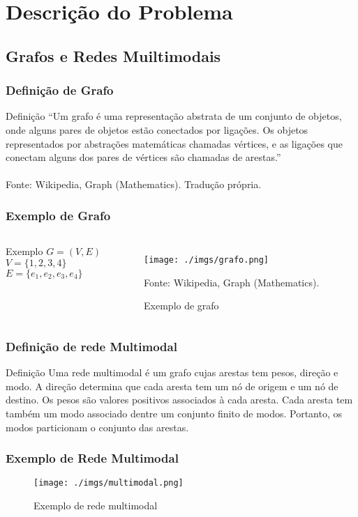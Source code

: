 \section{Descrição do Problema}

\subsection{Grafos e Redes Muiltimodais}

\frame
{
\frametitle{Definição de Grafo}
\begin{block}{Definição}
``Um grafo é uma representação abstrata de um conjunto de objetos, onde alguns pares de objetos estão conectados por ligações.
Os objetos representados por abstrações matemáticas chamadas vértices, e as ligações que conectam alguns dos pares de vértices são chamadas de arestas.''
\\ ~ \\
\tiny
Fonte: Wikipedia, Graph (Mathematics). Tradução própria.
\end{block}
}

\frame
{
\frametitle{Exemplo de Grafo}
\begin{columns}[c]
\column{1.5in}
	\begin{exampleblock}{Exemplo}
		$G = (V,E)$ \\
		$ $ \\
		$V = \{1,2,3,4\}$ \\
		$ $ \\
		$E = \{e_1,e_2,e_3,e_4\}$ 
	\end{exampleblock}
\column{1.5in}
	\begin{figure}
		\texttt{[image: ./imgs/grafo.png]}
		\caption{Exemplo de grafo}
		\tiny
		Fonte: Wikipedia, Graph (Mathematics).
	\end{figure}
\end{columns}
}

\frame
{
\frametitle{Definição de rede Multimodal}
\begin{block}{Definição}
Uma rede multimodal é um grafo cujas arestas tem pesos, direção e modo. A direção determina que cada aresta tem um nó de origem e um nó de destino.
Os pesos são valores positivos associados à cada aresta. Cada aresta tem também um modo associado dentre um conjunto finito de modos. Portanto, os modos particionam o conjunto das arestas.
\end{block}
}

\frame
{
\frametitle{Exemplo de Rede Multimodal}
	\begin{figure}
		\texttt{[image: ./imgs/multimodal.png]}
		\caption{Exemplo de rede multimodal}
	\end{figure}
}

